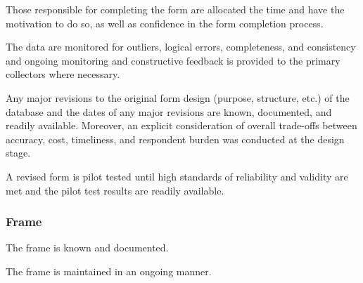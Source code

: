 \begin{QandA}
\begin{answered}
    \end{answered}

    \item Those responsible for completing the form are allocated the time and have the motivation to do so, as well as confidence in the form completion process.
    \begin{answered}
        
    \end{answered}

    \item The data are monitored for outliers, logical errors, completeness, and consistency and ongoing monitoring and constructive feedback is provided to the primary collectors where necessary.
    \begin{answered}
        
    \end{answered}

    \item Any major revisions to the original form design (purpose, structure, etc.) of the database and the dates of any major revisions are known, documented, and readily available. Moreover, an explicit consideration of overall trade-offs between accuracy, cost, timeliness, and respondent burden was conducted at the design stage.
    \begin{answered}
        
    \end{answered}

    \item A revised form is pilot tested until high standards of reliability and validity are met and the pilot test results are readily available.
    \begin{answered}
        
    \end{answered}

\end{QandA}

\subsubsection{Frame}

\begin{QandA}
    \item The frame is known and documented.
    \begin{answered}
        
    \end{answered}

    \item The frame is maintained in an ongoing manner.
    \begin{answered}
        
    \end{answered}

\end{QandA}

